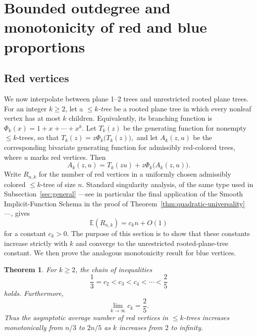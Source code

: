 \documentclass[10pt,a4paper]{amsart}
\newtheorem{theorem}{Theorem}[section]
\theoremstyle{remark}
\begin{document}
\section{Bounded outdegree and monotonicity of red and blue proportions}
\label{sec:bounded-outdegree}

\subsection{Red vertices}

We now interpolate between plane 1--2 trees and unrestricted rooted plane trees.  For an integer $k\ge 2$, let a \emph{$\leq k$-tree} be a rooted plane tree in which every nonleaf vertex has at most $k$ children.  Equivalently, its branching function is
$
\Phi_k(x)=1+x+\cdots+x^k.
$
Let $T_k(z)$ be the generating function for nonempty $\leq k$-trees, so that
$
T_k(z)=z\Phi_k\big(T_k(z)\big),
$
and let $A_k(z,u)$ be the corresponding bivariate generating function for admissibly red-colored trees, where $u$ marks red vertices.  Then
\[
A_k(z,u)=T_k(zu)+z\Phi_k\big(A_k(z,u)\big).
\]
Write $R_{n,k}$ for the number of red vertices in a uniformly chosen admissibly colored $\leq k$-tree of size $n$.  Standard singularity analysis, of the same type used in Subsection~\ref{sec:general} ---see in particular the final application of the Smooth Implicit-Function Schema in the proof of Theorem~\ref{thm:quadratic-universality}---, gives
\[
\mathbb E(R_{n,k})=c_k n+O(1)
\]
for a constant $c_k>0$.  The purpose of this section is to show that these constants increase strictly with $k$ and converge to the unrestricted rooted-plane-tree constant. We then prove the analogous monotonicity result for blue vertices.

\begin{theorem} \label{red-monotone}
For $k\ge 2$, the chain of inequalities
\[
\frac13=c_2<c_3<c_4<\cdots<\frac25 \] holds.
Furthermore, 
\[
\lim_{k\to\infty}c_k=\frac25.
\]
Thus the asymptotic average number of red vertices in $\leq k$-trees increases monotonically from $n/3$ to $2n/5$ as $k$ increases from $2$ to infinity.
\end{theorem}
\end{document}
